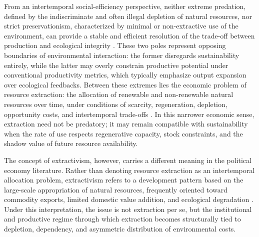 
From an intertemporal social-efficiency perspective, neither extreme predation, defined by the indiscriminate and often illegal depletion of natural resources, nor strict preservationism, characterized by minimal or non-extractive use of the environment, can provide a stable and efficient resolution of the trade-off between production and ecological integrity \cite{dasgupta2001human}. These two poles represent opposing boundaries of environmental interaction: the former disregards sustainability entirely, while the latter may overly constrain productive potential under conventional productivity metrics, which typically emphasize output expansion over ecological feedbacks. Between these extremes lies the economic problem of resource extraction: the allocation of renewable and non-renewable natural resources over time, under conditions of scarcity, regeneration, depletion, opportunity costs, and intertemporal trade-offs \cite{hotelling1931economics, clark2010mathematical, dasgupta2001human}. In this narrower economic sense, extraction need not be predatory; it may remain compatible with sustainability when the rate of use respects regenerative capacity, stock constraints, and the shadow value of future resource availability.

The concept of extractivism, however, carries a different meaning in the political economy literature. Rather than denoting resource extraction as an intertemporal allocation problem, extractivism refers to a development pattern based on the large-scale appropriation of natural resources, frequently oriented toward commodity exports, limited domestic value addition, and ecological degradation \cite{gudynas2009diez, acosta2013extractivism, mckay2017agrarian}. Under this interpretation, the issue is not extraction per se, but the institutional and productive regime through which extraction becomes structurally tied to depletion, dependency, and asymmetric distribution of environmental costs.


